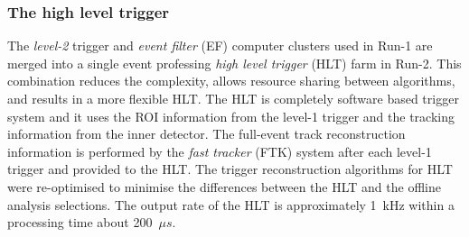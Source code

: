 
\subsubsection{The high level trigger}
\label{subsubsec:ae_HLT}
The \textit{level-2} trigger and \textit{event filter} (EF) computer clusters used in Run-1 are merged into a single event professing \textit{high level trigger} (HLT) farm in Run-2.
This combination reduces the complexity, allows resource sharing between algorithms, and results in a more flexible HLT.
The HLT is completely software based trigger system and it uses the ROI information from the level-1 trigger and the tracking information from the inner detector.
The full-event track reconstruction information is performed by the \textit{fast tracker} (FTK) system after each level-1 trigger and provided to the HLT.	 
The trigger reconstruction algorithms for HLT were re-optimised to minimise the differences between the HLT and the offline analysis selections.
The output rate of the HLT is approximately 1~kHz within a processing time about 200~$\mu s$.
